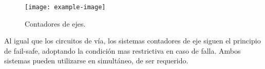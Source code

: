     \begin{figure}[!h]
        \centering
        \texttt{[image: example-image]}
        \centering\caption{Contadores de ejes.}
        \label{fig:deteccion_2}
    \end{figure}

Al igual que los circuitos de vía, los sistemas contadores de eje siguen el principio de fail-safe, adoptando la condición mas restrictiva en caso de falla. Ambos sistemas pueden utilizarse en simultáneo, de ser requerido.